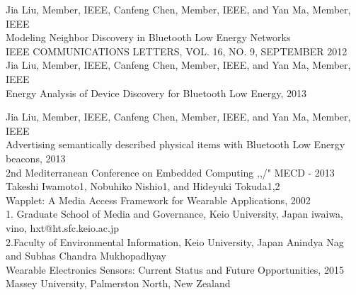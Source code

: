 \documentclass[12pt,a4paper]{report}
\begin{document}
\begin{thebibliography}{1}
 Jia Liu, Member, IEEE, Canfeng Chen, Member, IEEE, and Yan Ma, Member, IEEE\\ Modeling Neighbor Discovery in Bluetooth Low Energy Networks\\ 
IEEE COMMUNICATIONS LETTERS, VOL. 16, NO. 9, SEPTEMBER 2012
Jia Liu, Member, IEEE, Canfeng Chen, Member, IEEE, and Yan Ma, Member, IEEE\\ Energy Analysis of Device Discovery for
	Bluetooth Low Energy, 2013

	Jia Liu, Member, IEEE, Canfeng Chen, Member, IEEE, and Yan Ma, Member, IEEE\\ Advertising semantically described physical items
	with Bluetooth Low Energy beacons, 2013\\
	2nd Mediterranean Conference on Embedded Computing ,,/" MECD - 2013
Takeshi Iwamoto1, Nobuhiko Nishio1, and Hideyuki Tokuda1,2\\ Wapplet: A Media Access Framework for
	Wearable Applications, 2002\\
	1. Graduate School of Media and Governance, Keio University, Japan
	{iwaiwa, vino, hxt}@ht.sfc.keio.ac.jp\\
	2.Faculty of Environmental Information, Keio University, Japan
 	Anindya Nag and Subhas Chandra Mukhopadhyay\\
Wearable Electronics Sensors: Current Status
	and Future Opportunities, 2015\\
	Massey University,
	Palmerston North, New Zealand 
\end{thebibliography}
\end{document}

